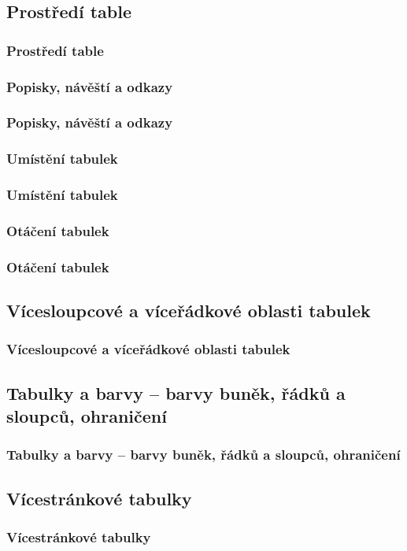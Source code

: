 \subsection{Prostředí table}
\begin{frame}
	\frametitle{Prostředí table}
\end{frame}


\subsubsection{Popisky, návěští a odkazy}
\begin{frame}
	\frametitle{Popisky, návěští a odkazy}
\end{frame}


\subsubsection{Umístění tabulek}
\begin{frame}
	\frametitle{Umístění tabulek}
\end{frame}


\subsubsection{Otáčení tabulek}
\begin{frame}
	\frametitle{Otáčení tabulek}
\end{frame}


\subsection{Vícesloupcové a víceřádkové oblasti tabulek}
\begin{frame}
	\frametitle{Vícesloupcové a víceřádkové oblasti tabulek}
\end{frame}


\subsection{Tabulky a barvy -- barvy buněk, řádků a sloupců, ohraničení}
\begin{frame}
	\frametitle{Tabulky a barvy -- barvy buněk, řádků a sloupců, ohraničení}
\end{frame}


\subsection{Vícestránkové tabulky}
\begin{frame}
	\frametitle{Vícestránkové tabulky}
\end{frame}

\endinput
